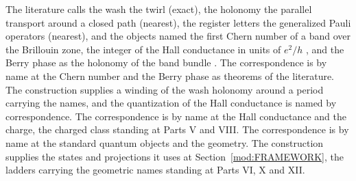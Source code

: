 \chdeps{}{}
\begin{chbridge}
The literature calls the wash the twirl (exact), the holonomy the parallel transport around a closed path (nearest), the register letters the generalized Pauli operators (nearest), and the objects named the first Chern number of a band over the Brillouin zone, the integer of the Hall conductance in units of $e^{2}/h$ \cite{Thouless1982,Klitzing1980}, and the Berry phase as the holonomy of the band bundle \cite{Berry1984}. The correspondence is by name at the Chern number and the Berry phase as theorems of the literature. The construction supplies a winding of the wash holonomy around a period carrying the names, and the quantization of the Hall conductance is named by correspondence. The correspondence is by name at the Hall conductance and the charge, the charged class standing at Parts V and VIII. The correspondence is by name at the standard quantum objects and the geometry. The construction supplies the states and projections it uses at Section~\ref{mod:FRAMEWORK}, the ladders carrying the geometric names standing at Parts VI, X and XII.
\end{chbridge}

